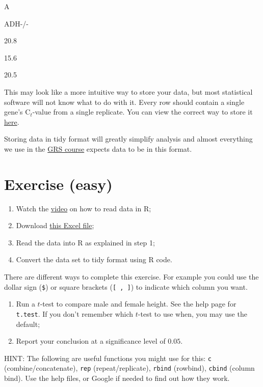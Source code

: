 \documentclass[
]{book}
\providecommand{\tightlist}{%
  \setlength{\itemsep}{0pt}\setlength{\parskip}{0pt}}
\begin{document}
A

ADH-/-

20.8

15.6

20.5

This may look like a more intuitive way to store your data, but most statistical software will not know what to do with it. Every row should contain a single gene's C\(_t\)-value from a single replicate. You can view the correct way to store it \href{https://docs.google.com/spreadsheets/d/1zBw0JX1JqALqF7m1CLQp4ojd1LUDoYHxnc6xIUYQVYY/}{here}.

Storing data in tidy format will greatly simplify analysis and almost everything we use in the \href{https://fransrodenburg.github.io/General-Research-Skills/}{GRS course} expects data to be in this format.

\hypertarget{exercise-easy-1}{%
\section{Exercise (easy)}\label{exercise-easy-1}}

\begin{enumerate}
\def\labelenumi{\arabic{enumi}.}
\tightlist
\item
  Watch the \href{https://youtu.be/BGUqZc-Pb8w}{video} on how to read data in R;
\item
  Download \href{data/humanheight.xlsx}{this Excel file};
\item
  Read the data into R as explained in step 1;
\item
  Convert the data set to tidy format using R code.
\end{enumerate}

There are different ways to complete this exercise. For example you could use the dollar sign (\texttt{\$}) or square brackets (\texttt{{[}\ ,\ {]}}) to indicate which column you want.

\begin{enumerate}
\def\labelenumi{\arabic{enumi}.}
\setcounter{enumi}{4}
\tightlist
\item
  Run a \(t\)-test to compare male and female height. See the help page for \texttt{t.test}. If you don't remember which \(t\)-test to use when, you may use the default;
\item
  Report your conclusion at a significance level of \(0.05\).
\end{enumerate}

HINT: The following are useful functions you might use for this: \texttt{c} (combine/concatenate), \texttt{rep} (repeat/replicate), \texttt{rbind} (rowbind), \texttt{cbind} (column bind). Use the help files, or Google if needed to find out how they work.
\end{document}
